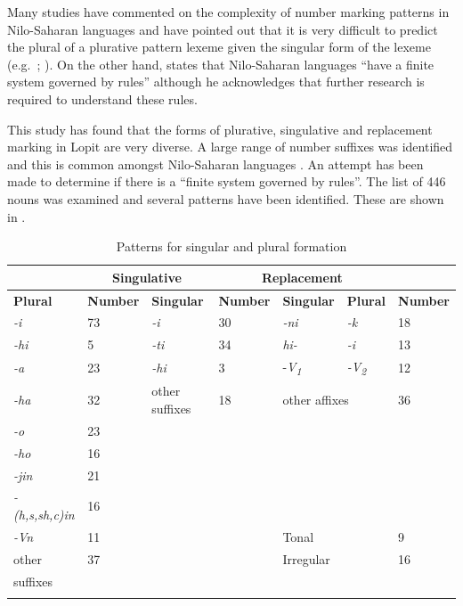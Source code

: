 \documentclass[output=paper]{langsci/langscibook}
\begin{document}
Many studies have commented on the complexity of number marking patterns in Nilo-Saharan languages and have pointed out that it is very difficult to predict the plural of a plurative pattern lexeme given the singular form of the lexeme (e.g.\ \citealt[4]{TuckerMpaayei1955}; \citealt[3]{HildersLawrance1957}). On the other hand, \citet[255]{Dimmendaal2000} states that Nilo-Saharan languages “have a finite system governed by rules” although he acknowledges that further research is required to understand these rules. 

This study has found that the forms of plurative, singulative and replacement marking in Lopit are very diverse. A large range of number suffixes was identified and this is common amongst Nilo-Saharan languages \citep[219]{Dimmendaal2000}. An attempt has been made to determine if there is a “finite system governed by rules”. The list of 446 nouns was examined and several patterns have been identified. These are shown in . 

\begin{table}
\begin{tabularx}{\textwidth}{lXXXXXX}
\lsptoprule

\multicolumn{2}{c}{ \textbf{Plurative}} & \multicolumn{2}{c}{ \textbf{Singulative}} & \multicolumn{3}{c}{ \textbf{Replacement}}\\ \midrule
 \textbf{Plural} & \textbf{Number} & \textbf{Singular} & \textbf{Number} & \textbf{Singular} & \textbf{Plural} & \textbf{Number}\\ \midrule
\itshape {}-i & 73 & \itshape {}-i & 30 & \itshape {}-ni & \itshape {}-k & 18\\
\itshape {}-hi & 5 & \itshape {}-ti & 34 & \itshape hi- & \itshape {}-i & 13\\
\itshape {}-a & 23 & \itshape {}-hi & 3 & {}-\textit{V}\textit{\textsubscript{1}}\textit{  } & \itshape {}-V\textsubscript{2} & 12\\
\itshape {}-ha & 32 & other suffixes & 18 & \multicolumn{2}{l}{other affixes} & 36\\
\itshape {}-o & 23 &  &  &  &  & \\
\itshape {}-ho & 16 &  &  &  &  & \\
\itshape {}-jin & 21 &  &  &  &  & \\
\itshape {}-(h,s,sh,c)in & 16 &  &  &  &  & \\
\hhline{~~~~---}
\itshape {}-Vn & 11 &  &  & Tonal &  & 9\\
other & 37 &  &  & Irregular &  & 16\\
suffixes & & & & & & \\
\lspbottomrule
\end{tabularx}
\caption{Patterns for singular and plural formation}
\label{tab:moodie:9}
\end{table}
\end{document}
